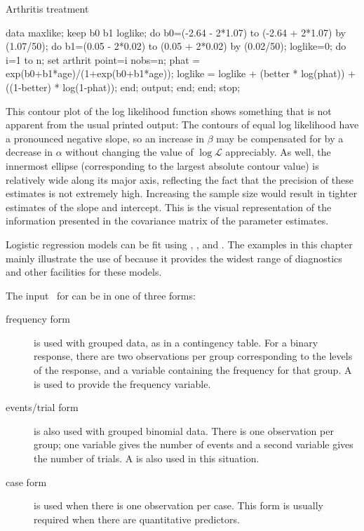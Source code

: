 \begin{Example}[arthrit6a]{Arthritis treatment}
\begin{listing}
data maxlike;
   keep b0 b1 loglike;
   do b0=(-2.64 - 2*1.07) to (-2.64 + 2*1.07) by (1.07/50);
      do b1=(0.05 - 2*0.02) to (0.05 + 2*0.02) by (0.02/50);
         loglike=0;
         do i=1 to n;
            set arthrit point=i nobs=n;
            phat = exp(b0+b1*age)/(1+exp(b0+b1*age));
            loglike = loglike + (better * log(phat))
                                  + ((1-better) * log(1-phat));
            end;
         output;
         end;
      end;
   stop;
\end{listing}
This contour plot of the log likelihood function shows something that
is not apparent from the usual printed output:
The contours of equal log likelihood have a pronounced negative slope,
so an increase in $\beta$ may be compensated for by a decrease in 
$\alpha$ without changing the value of $\log \mathcal{L}$ appreciably.
As well, the innermost ellipse (corresponding to the largest absolute
contour value) is relatively wide along its major axis,
reflecting the fact that the precision of these estimates is not
extremely high.   Increasing the sample size would result in tighter
estimates of the slope and intercept.
This is the visual representation of the information presented in the
covariance matrix of the parameter estimates.
\end{Example}

Logistic regression models can be fit using , ,
 and \INSIGHT.  The examples in this chapter mainly
illustrate 
the use of  because it provides the widest range of
diagnostics and other facilities for these models.
  
The input \Dset\ for  can
be in one of three forms:
\begin{description}
\item[frequency form] is used with grouped data, as in a contingency table.
For a binary response,
there are two observations per group corresponding to the levels
of the response, and a variable containing the frequency for that
group.  A  is used to provide the frequency
variable.

\item[events/trial form] is also used with grouped binomial data.
There is one observation per group; one variable gives the number of
events and a second variable gives the number of trials.
A  is also used in this situation.

\item[case form] is used when there is one observation per case.
This form  is usually required when there are quantitative predictors.
\end{description}

